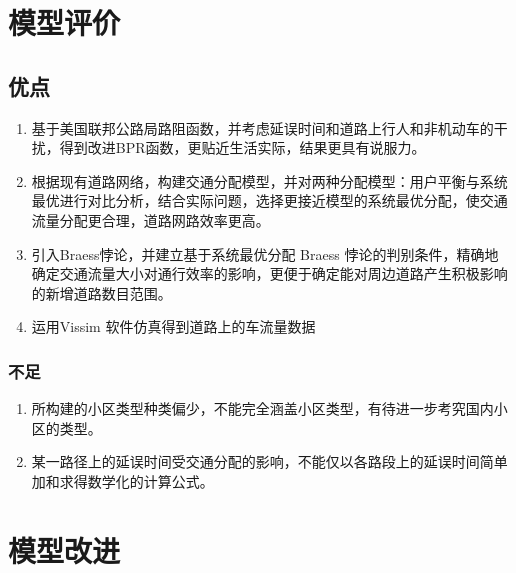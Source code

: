 \documentclass[fontset=windows,a4paper,12pt]{ctexart}
\begin{document}
  \section{模型评价}
	  \subsection{优点}
		  \begin{enumerate}
		  	\item 基于美国联邦公路局路阻函数，并考虑延误时间和道路上行人和非机动车的干扰，得到改进BPR函数，更贴近生活实际，结果更具有说服力。
		  	\item 根据现有道路网络，构建交通分配模型，并对两种分配模型：用户平衡与系统最优进行对比分析，结合实际问题，选择更接近模型的系统最优分配，使交通流量分配更合理，道路网路效率更高。
		  	\item 引入Braess悖论，并建立基于系统最优分配 Braess 悖论的判别条件，精确地确定交通流量大小对通行效率的影响，更便于确定能对周边道路产生积极影响的新增道路数目范围。
		  	\item 运用Vissim 软件仿真得到道路上的车流量数据
		  \end{enumerate}
	  \subsubsection{不足}
		  \begin{enumerate}
			  \item 所构建的小区类型种类偏少，不能完全涵盖小区类型，有待进一步考究国内小区的类型。
			  \item 某一路径上的延误时间受交通分配的影响，不能仅以各路段上的延误时间简单加和求得数学化的计算公式。
		  \end{enumerate}
	\section{模型改进}
  \newpage
  
  
\end{document}
